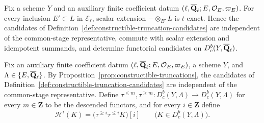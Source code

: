 \begin{proposition}
\label{prop:constructible-truncations}


Fix a scheme \(Y\) and an auxiliary finite coefficient datum
\((\ell,\overline{\mathbf Q}_\ell;E,\mathcal O_E,\varpi_E)\).  For every inclusion
\(E'\subset L\) in \(\mathcal E_\ell\), scalar extension
\(-\otimes_{E'}L\) is \(t\)-exact.  Hence the candidates of
Definition~\ref{def:constructible-truncation-candidates} are independent of
the common-stage representative, commute with scalar extension and
idempotent summands, and determine functorial candidates on
\(D^b_c(Y,\overline{\mathbf Q}_\ell)\).
\end{proposition}


\begin{definition}
\label{def:constructible-truncation-functors}


Fix an auxiliary finite coefficient datum
\((\ell,\overline{\mathbf Q}_\ell;E,\mathcal O_E,\varpi_E)\), a scheme \(Y\), and
\(\Lambda\in\{E,\overline{\mathbf Q}_\ell\}\).  By
Proposition~\ref{prop:constructible-truncations}, the candidates of
Definition~\ref{def:constructible-truncation-candidates} are independent of
the common-stage representative.  Define
\(\tau^{\leq m},\tau^{\geq m}:D^b_c(Y,\Lambda)\to D^b_c(Y,\Lambda)\)
for every \(m\in\mathbf Z\) to be the descended functors, and for every
\(i\in\mathbf Z\) define
\[
 \mathcal H^i(K)=\bigl(\tau^{\geq i}\tau^{\leq i}K\bigr)[i]
 \qquad\bigl(K\in D^b_c(Y,\Lambda)\bigr).
\]
\end{definition}


